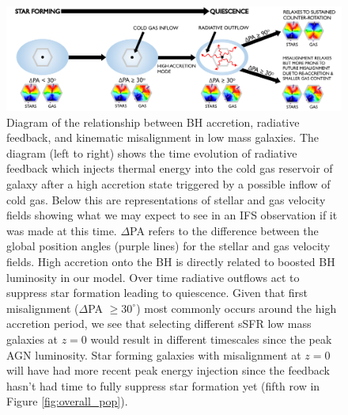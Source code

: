 \begin{landscape}
\begin{figure}
	\includegraphics[width=\linewidth]{misalignment_BH/quasar_mode_feedback_compressed.pdf}
    \caption{Diagram of the relationship between BH accretion, radiative feedback, and kinematic misalignment in low mass galaxies. The diagram (left to right) shows the time evolution of radiative feedback which injects thermal energy into the cold gas reservoir of galaxy after a high accretion state triggered by a possible inflow of cold gas. Below this are representations of stellar and gas velocity fields showing what we may expect to see in an IFS observation if it was made at this time. $\Delta$PA refers to the difference between the global position angles (purple lines) for the stellar and gas velocity fields. High accretion onto the BH is directly related to boosted BH luminosity in our model. Over time radiative outflows act to suppress star formation leading to quiescence. Given that first misalignment ($\Delta$PA $\geq 30^{\circ}$) most commonly occurs around the high accretion period, we see that selecting different sSFR low mass galaxies at $z=0$ would result in different timescales since the peak AGN luminosity. Star forming galaxies with misalignment at $z=0$ will have had more recent peak energy injection since the feedback hasn't had time to fully suppress star formation yet (fifth row in Figure \ref{fig:overall_pop}).}
    \label{fig:diagram}
\end{figure}
\end{landscape}

